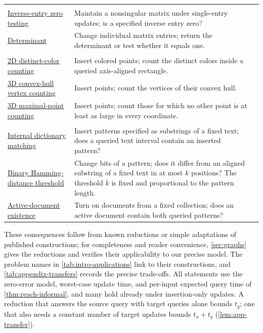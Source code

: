 \documentclass[11pt]{article}
\theoremstyle{plain}
\theoremstyle{definition}
\theoremstyle{remark}
\begin{document}
\begin{longtable}{@{}>{\raggedright\arraybackslash}p{}>{\raggedright\arraybackslash}p{}>{\raggedright\arraybackslash}p{}@{}}
\midrule
\multicolumn{3}{@{}l}{\emph{Matrices over prime fields of size $\Theta(N)$}}\\*
\hyperref[sec:app-inverse]{Inverse-entry zero testing} & Maintain a nonsingular matrix under single-entry updates; is a specified inverse entry zero? & \cite{van_den_brand_dynamic_2019} \\
\addlinespace[2pt]
\hyperref[sec:app-determinant]{Determinant} & Change individual matrix entries; return the determinant or test whether it equals one. & \cite{van_den_brand_dynamic_2019} \\
\midrule
\multicolumn{3}{@{}l}{\emph{Geometry}}\\*
\hyperref[sec:distinct-color-counting]{2D distinct-color counting} & Insert colored points; count the distinct colors inside a queried axis-aligned rectangle. & \cite{jin_tight_2022} \\
\addlinespace[2pt]
\hyperref[sec:hull]{3D convex-hull vertex counting} & Insert points; count the vertices of their convex hull. & \cite{dallant_conditional_2022} \\
\addlinespace[2pt]
\hyperref[sec:maxima]{3D maximal-point counting} & Insert points; count those for which no other point is at least as large in every coordinate. & \cite{dallant_conditional_2022,jin_tight_2022} \\
\midrule
\multicolumn{3}{@{}l}{\emph{Strings}}\\*
\hyperref[sec:internal-dictionary]{Internal dictionary matching} & Insert patterns specified as substrings of a fixed text; does a queried text interval contain an inserted pattern? & \cite{charalampopoulos_internal_2019} \\
\addlinespace[2pt]
\hyperref[sec:hamming-threshold]{Binary Hamming-distance threshold} & Change bits of a pattern; does it differ from an aligned substring of a fixed text in at most $k$ positions? The threshold $k$ is fixed and proportional to the pattern length. & \cite{clifford_upper_2018} \\
\addlinespace[2pt]
\hyperref[sec:active-documents]{Active-document existence} & Turn on documents from a fixed collection; does an active document contain both queried patterns? & \cite{jin_tight_2022} \\
\end{longtable}
\endgroup
These consequences follow from known reductions or simple adaptations of published constructions; for completeness and reader convenience, \cref{sec:graphs} gives the reductions and verifies their applicability to our precise model. The problem names in \cref{tab:intro-applications} link to their constructions, and \cref{tab:appendix-transfers} records the precise trade-offs.
All statements use the zero-error model, worst-case update time, and per-input expected query time of \cref{thm:reach-informal}, and many hold already under insertion-only updates. A reduction that answers the source query with target queries alone bounds $t_q$; one that also needs a constant number of target updates bounds $t_u+t_q$ (\cref{lem:app-transfer}).
\end{document}

